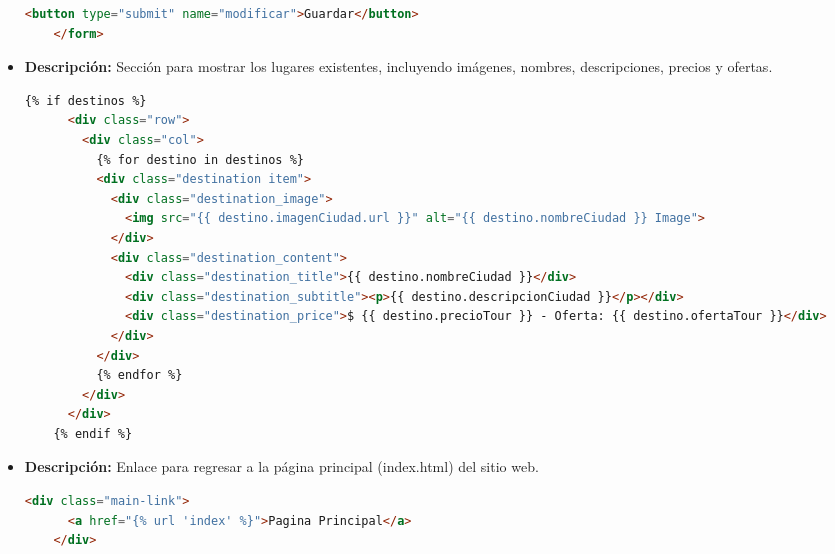 \documentclass{article}
\begin{document}
\begin{itemize}
\begin{lstlisting}[language=html]
      <button type="submit" name="modificar">Guardar</button>
    </form>
    \end{lstlisting}
    \item \textbf{Descripción: }Sección para mostrar los lugares existentes, incluyendo imágenes, nombres, descripciones, precios y ofertas.
    \begin{lstlisting}[language=html]
    {% if destinos %}
      <div class="row">
        <div class="col">
          {% for destino in destinos %}
          <div class="destination item">
            <div class="destination_image">
              <img src="{{ destino.imagenCiudad.url }}" alt="{{ destino.nombreCiudad }} Image">
            </div>
            <div class="destination_content">
              <div class="destination_title">{{ destino.nombreCiudad }}</div>
              <div class="destination_subtitle"><p>{{ destino.descripcionCiudad }}</p></div>
              <div class="destination_price">$ {{ destino.precioTour }} - Oferta: {{ destino.ofertaTour }}</div>
            </div>
          </div>
          {% endfor %}
        </div>
      </div>
    {% endif %}
    \end{lstlisting}
    \item \textbf{Descripción: }Enlace para regresar a la página principal (index.html) del sitio web.
    \begin{lstlisting}[language=html]
    <div class="main-link">
      <a href="{% url 'index' %}">Pagina Principal</a>
    </div>
    \end{lstlisting}
  \end{itemize}
  \newpage
  
\end{document}
